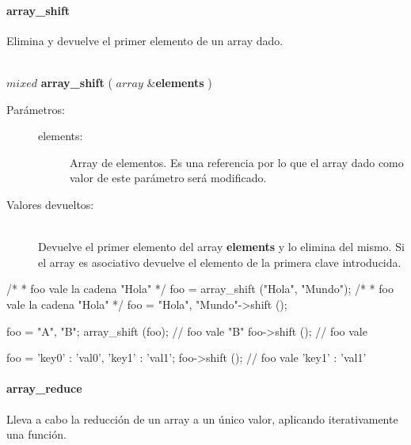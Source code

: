 \paragraph{array\_shift}
Elimina y devuelve el primer elemento de un array dado. 

\begin{framed}
\hfill \\ $mixed$ \textbf{array\_shift} ( $array$ \&\textbf{elements} )  
\begin{description}
\item [Parámetros:] \hfill 
   \begin{description}
   \item[elements:] Array de elementos. Es una referencia por lo que el array dado como valor de este parámetro será modificado. 
   \end{description}
\item[Valores devueltos:] \hfill \\
   Devuelve el primer elemento del array \textbf{elements} y lo elimina del mismo. Si el array es asociativo devuelve el
   elemento de la primera clave introducida.
\end{description}
\end{framed}
     
\begin{myverbatim}   
   /*
    * foo vale la cadena "Hola"
    */
   foo = array_shift ({"Hola", "Mundo"}); 
   /*
    * foo vale la cadena "Hola"
    */
   foo = {"Hola", "Mundo"}->shift ();
   
   foo = {"A", "B"};
   array_shift (foo); // foo vale { "B" }
   foo->shift (); // foo vale { }
   
   foo = { 'key0' : 'val0', 'key1' : 'val1'};
   foo->shift (); // foo vale { 'key1' : 'val1' }
\end{myverbatim}

\paragraph{array\_reduce}
Lleva a cabo la reducción de un array a un único valor, aplicando iterativamente una función. 


